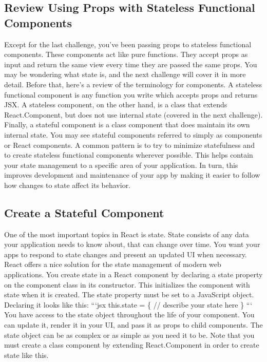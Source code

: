 \documentclass{article}%
\begin{document}
%
\subsection{Review Using Props with Stateless Functional Components}%
\label{subsec:ReviewUsingPropswithStatelessFunctionalComponents}%
Except for the last challenge, you've been passing props to stateless functional components. These components act like pure functions. They accept props as input and return the same view every time they are passed the same props. You may be wondering what state is, and the next challenge will cover it in more detail. Before that, here's a review of the terminology for components.\newline%
A stateless functional component is any function you write which accepts props and returns JSX. A stateless component, on the other hand, is a class that extends React.Component, but does not use internal state (covered in the next challenge). Finally, a stateful component is a class component that does maintain its own internal state. You may see stateful components referred to simply as components or React components.\newline%
A common pattern is to try to minimize statefulness and to create stateless functional components wherever possible. This helps contain your state management to a specific area of your application. In turn, this improves development and maintenance of your app by making it easier to follow how changes to state affect its behavior.\newline%

%
\subsection{Create a Stateful Component}%
\label{subsec:CreateaStatefulComponent}%
One of the most important topics in React is state. State consists of any data your application needs to know about, that can change over time. You want your apps to respond to state changes and present an updated UI when necessary. React offers a nice solution for the state management of modern web applications.\newline%
You create state in a React component by declaring a state property on the component class in its constructor. This initializes the component with state when it is created. The state property must be set to a JavaScript object. Declaring it looks like this:\newline%
```jsx\newline%
this.state = \{\newline%
  // describe your state here\newline%
\}\newline%
```\newline%
You have access to the state object throughout the life of your component. You can update it, render it in your UI, and pass it as props to child components. The state object can be as complex or as simple as you need it to be. Note that you must create a class component by extending React.Component in order to create state like this.\newline%
\end{document}
